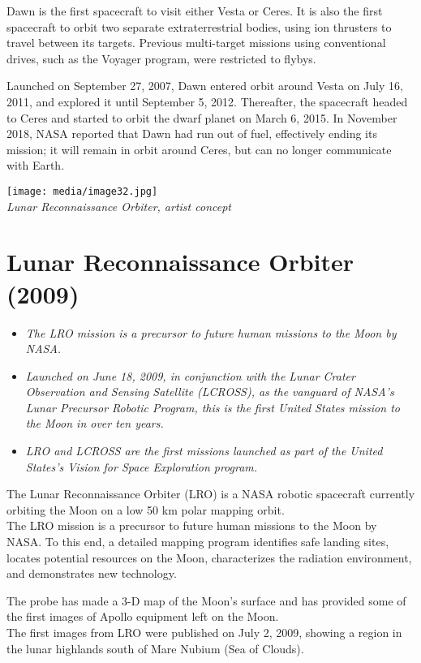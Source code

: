 Dawn is the first spacecraft to visit either Vesta or Ceres. It is also
the first spacecraft to orbit two separate extraterrestrial bodies,
using ion thrusters to travel between its targets. Previous multi-target
missions using conventional drives, such as the Voyager program, were
restricted to flybys.

Launched on September 27, 2007, Dawn entered orbit around Vesta on July
16, 2011, and explored it until September 5, 2012. Thereafter, the
spacecraft headed to Ceres and started to orbit the dwarf planet on
March 6, 2015. In November 2018, NASA reported that Dawn had run out of
fuel, effectively ending its mission; it will remain in orbit around
Ceres, but can no longer communicate with Earth.

\texttt{[image: media/image32.jpg]}\\
\emph{Lunar Reconnaissance Orbiter, artist concept}

\section{Lunar Reconnaissance Orbiter
(2009)}\label{lunar-reconnaissance-orbiter-2009}

\begin{itemize}
\item
  \emph{The LRO mission is a precursor to future human missions to the
  Moon by NASA.}
\item
  \emph{Launched on June 18, 2009, in conjunction with the Lunar Crater
  Observation and Sensing Satellite (LCROSS), as the vanguard of NASA's
  Lunar Precursor Robotic Program, this is the first United States
  mission to the Moon in over ten years.}
\item
  \emph{LRO and LCROSS are the first missions launched as part of the
  United States's Vision for Space Exploration program.}
\end{itemize}

The Lunar Reconnaissance Orbiter (LRO) is a NASA robotic spacecraft
currently orbiting the Moon on a low 50 km polar mapping orbit.\\
The LRO mission is a precursor to future human missions to the Moon by
NASA. To this end, a detailed mapping program identifies safe landing
sites, locates potential resources on the Moon, characterizes the
radiation environment, and demonstrates new technology.

The probe has made a 3-D map of the Moon's surface and has provided some
of the first images of Apollo equipment left on the Moon.\\
The first images from LRO were published on July 2, 2009, showing a
region in the lunar highlands south of Mare Nubium (Sea of Clouds).

